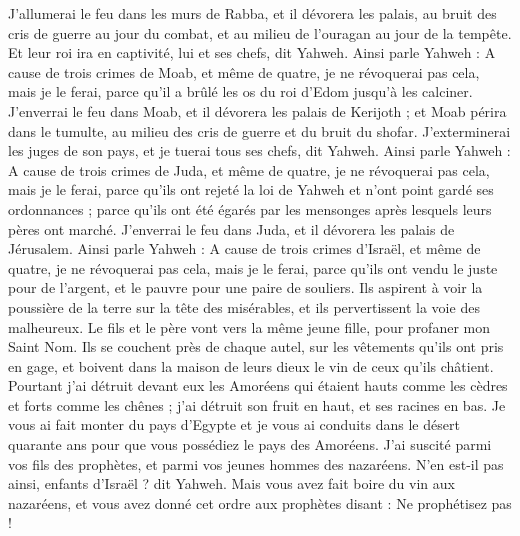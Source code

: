 \begin{multicols}{2}
J'allumerai le feu dans les murs de Rabba, et il dévorera les palais, au bruit des cris de guerre au jour du combat, et au milieu de l’ouragan au jour de la tempête.
Et leur roi ira en captivité, lui et ses chefs, dit Yahweh.
\VerseOne{}Ainsi parle Yahweh : A cause de trois crimes de Moab, et même de quatre, je ne révoquerai pas cela, mais je le ferai, parce qu'il a brûlé les os du roi d'Edom jusqu’à les calciner.
J'enverrai le feu dans Moab, et il dévorera les palais de Kerijoth ; et Moab périra dans le tumulte, au milieu des cris de guerre et du bruit du shofar.
J'exterminerai les juges de son pays, et je tuerai tous ses chefs, dit Yahweh.
Ainsi parle Yahweh : A cause de trois crimes de Juda, et même de quatre, je ne révoquerai pas cela, mais je le ferai, parce qu'ils ont rejeté la loi de Yahweh et n'ont point gardé ses ordonnances ; parce qu’ils ont été égarés par les mensonges après lesquels leurs pères ont marché.
J'enverrai le feu dans Juda, et il dévorera les palais de Jérusalem.
Ainsi parle Yahweh : A cause de trois crimes d'Israël, et même de quatre, je ne révoquerai pas cela, mais je le ferai, parce qu'ils ont vendu le juste pour de l'argent, et le pauvre pour une paire de souliers.
Ils aspirent à voir la poussière de la terre sur la tête des misérables, et ils pervertissent la voie des malheureux. Le fils et le père vont vers la même jeune fille, pour profaner mon Saint Nom.
Ils se couchent près de chaque autel, sur les vêtements qu'ils ont pris en gage, et boivent dans la maison de leurs dieux le vin de ceux qu’ils châtient.
Pourtant j'ai détruit devant eux les Amoréens qui étaient hauts comme les cèdres et forts comme les chênes ; j'ai détruit son fruit en haut, et ses racines en bas.
Je vous ai fait monter du pays d'Egypte et je vous ai conduits dans le désert quarante ans pour que vous possédiez le pays des Amoréens.
J'ai suscité parmi vos fils des prophètes, et parmi vos jeunes hommes des nazaréens. N'en est-il pas ainsi, enfants d'Israël ? dit Yahweh.
Mais vous avez fait boire du vin aux nazaréens, et vous avez donné cet ordre aux prophètes disant : Ne prophétisez pas !

\end{multicols}
